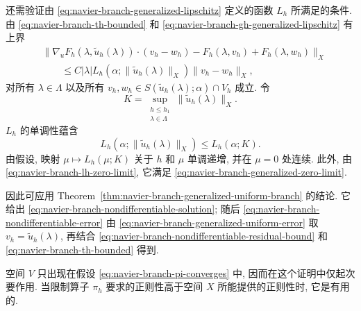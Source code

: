 \begin{Proof}
还需验证由 \eqref{eq:navier-branch-generalized-lipschitz} 定义的函数 $L_h$
所满足的条件. 由 \eqref{eq:navier-branch-th-bounded} 和
\eqref{eq:navier-branch-gh-generalized-lipschitz} 有上界
\begin{align*}
&\|\nabla_uF_h(\lambda,\widetilde u_h(\lambda))\cdot(v_h-w_h)
-F_h(\lambda,v_h)+F_h(\lambda,w_h)\|_X\\
&\qquad\leq C|\lambda|L_h(\alpha;\|\widetilde u_h(\lambda)\|_X)
\|v_h-w_h\|_X,
\end{align*}
对所有 $\lambda\in\Lambda$ 以及所有
$v_h,w_h\in S(\widetilde u_h(\lambda);\alpha)\cap V_h$ 成立. 令
\[
K=\sup_{\substack{h\leq h_1\\\lambda\in\Lambda}}
\|\widetilde u_h(\lambda)\|_X.
\]
$L_h$ 的单调性蕴含
\[
L_h(\alpha;\|\widetilde u_h(\lambda)\|_X)\leq L_h(\alpha;K).
\]
由假设, 映射 $\mu\mapsto L_h(\mu;K)$ 关于 $h$ 和 $\mu$ 单调递增,
并在 $\mu=0$ 处连续. 此外, 由 \eqref{eq:navier-branch-lh-zero-limit},
它满足 \eqref{eq:navier-branch-generalized-zero-limit}.

因此可应用 Theorem~\ref{thm:navier-branch-generalized-uniform-branch} 的结论.
它给出 \eqref{eq:navier-branch-nondifferentiable-solution}; 随后
\eqref{eq:navier-branch-nondifferentiable-error} 由
\eqref{eq:navier-branch-generalized-uniform-error} 取
$v_h=\widetilde u_h(\lambda)$, 再结合
\eqref{eq:navier-branch-nondifferentiable-residual-bound} 和
\eqref{eq:navier-branch-th-bounded} 得到.
\end{Proof}

\setcounter{statement}{8}
\begin{Remark}\label{rem:navier-branch-regularity-space-v}
空间 $V$ 只出现在假设 \eqref{eq:navier-branch-pi-converges} 中,
因而在这个证明中仅起次要作用. 当限制算子 $\pi_h$ 要求的正则性高于空间 $X$
所能提供的正则性时, 它是有用的.
\end{Remark}
